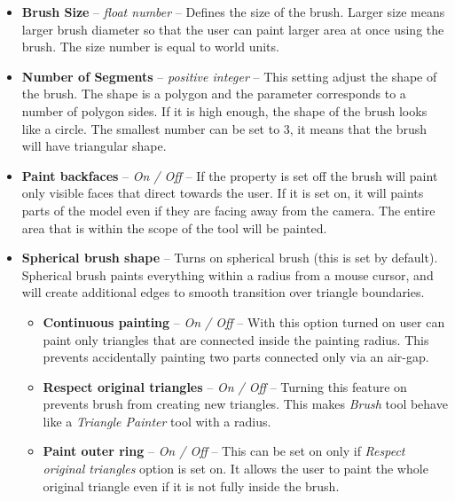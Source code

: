 \begin{itemize}

\item \textbf{Brush Size} -- \textit{float number} -- Defines the size of the brush. Larger size means larger brush diameter so that the user can paint larger area at once using the brush. The size number is equal to world units.

\item \textbf{Number of Segments} -- \textit{positive integer} -- This setting adjust the shape of the brush. The shape is a polygon and the parameter corresponds to a number of polygon sides. If it is high enough, the shape of the brush looks like a circle. The smallest number can be set to 3, it means that the brush will have triangular shape.

\item \textbf{Paint backfaces} -- \textit{On / Off} -- If the property is set off the brush will paint only visible faces that direct towards the user. If it is set on, it will paints parts of the model even if they are facing away from the camera. The entire area that is within the scope of the tool will be painted.


\item \textbf{Spherical brush shape} -- Turns on spherical brush (this is set by default).  Spherical brush paints everything within a radius from a mouse cursor, and will create additional edges to smooth transition over triangle boundaries.

\begin{itemize}
\item \textbf{Continuous painting} -- \textit{On / Off} -- With this option turned on user can paint only triangles that are connected inside the painting radius. This prevents accidentally painting two parts connected only via  an air-gap.

\item \textbf{Respect original triangles} -- \textit{On / Off} -- Turning this feature on prevents brush from creating new triangles. This makes \textit{Brush} tool behave like a \textit{Triangle Painter} tool with a radius.

\item \textbf{Paint outer ring} -- \textit{On / Off} -- This can be set on only if \textit{Respect original triangles} option is set on. It allows the user to paint the whole original triangle even if it is not fully inside the brush.
\end{itemize}


\end{itemize}
